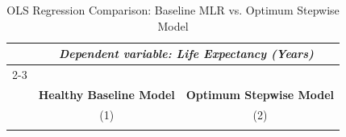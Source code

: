 \documentclass[3pt, a4paper]{article}
\begin{document}
\begin{singlespace}
\small
\begin{longtable}{lcc}
\caption{OLS Regression Comparison: Baseline MLR vs. Optimum Stepwise Model} \label{tab:regression_comparison} \\
\toprule
 & \multicolumn{2}{c}{\textit{Dependent variable: Life Expectancy (Years)}} \\ 
\cline{2-3} 
\\[-1.8ex] & \textbf{Healthy Baseline Model} & \textbf{Optimum Stepwise Model} \\ 
 & (1) & (2)\\ 
\midrule 
\endhead %

\bottomrule
\endfoot %


\end{longtable}
\end{singlespace}
\end{document}

